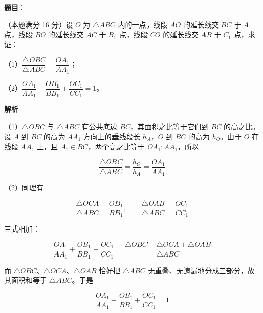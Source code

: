 \begin{answer}

\textbf{题目}：

（本题满分 16 分）设 $O$ 为 $\triangle ABC$ 内的一点，线段 $AO$ 的延长线交 $BC$ 于 $A_1$ 点，线段 $BO$ 的延长线交 $AC$ 于 $B_1$ 点，线段 $CO$ 的延长线交 $AB$ 于 $C_1$ 点，求证：

（1）$\dfrac{\triangle OBC}{\triangle ABC}=\dfrac{OA_1}{AA_1}$；

（2）$\dfrac{OA_1}{AA_1}+\dfrac{OB_1}{BB_1}+\dfrac{OC_1}{CC_1}=1$。

\textbf{解析}

（1）$\triangle OBC$ 与 $\triangle ABC$ 有公共底边 $BC$，其面积之比等于它们到 $BC$ 的高之比。设 $A$ 到 $BC$ 的高为 $AA_1$ 方向上的垂线段长 $h_A$，$O$ 到 $BC$ 的高为 $h_O$。由于 $O$ 在线段 $AA_1$ 上，且 $A_1\in BC$，两个高之比等于 $OA_1:AA_1$，所以

\nopagebreak[4]
\[
\frac{\triangle OBC}{\triangle ABC}=\frac{h_O}{h_A}=\frac{OA_1}{AA_1}
\]

（2）同理有

\nopagebreak[4]
\[
\frac{\triangle OCA}{\triangle ABC}=\frac{OB_1}{BB_1},\qquad
\frac{\triangle OAB}{\triangle ABC}=\frac{OC_1}{CC_1}
\]

三式相加：

\nopagebreak[4]
\[
\frac{OA_1}{AA_1}+\frac{OB_1}{BB_1}+\frac{OC_1}{CC_1}
=\frac{\triangle OBC+\triangle OCA+\triangle OAB}{\triangle ABC}
\]

而 $\triangle OBC$、$\triangle OCA$、$\triangle OAB$ 恰好把 $\triangle ABC$ 无重叠、无遗漏地分成三部分，故其面积和等于 $\triangle ABC$。于是

\nopagebreak[4]
\[
\frac{OA_1}{AA_1}+\frac{OB_1}{BB_1}+\frac{OC_1}{CC_1}=1
\]


\end{answer}
